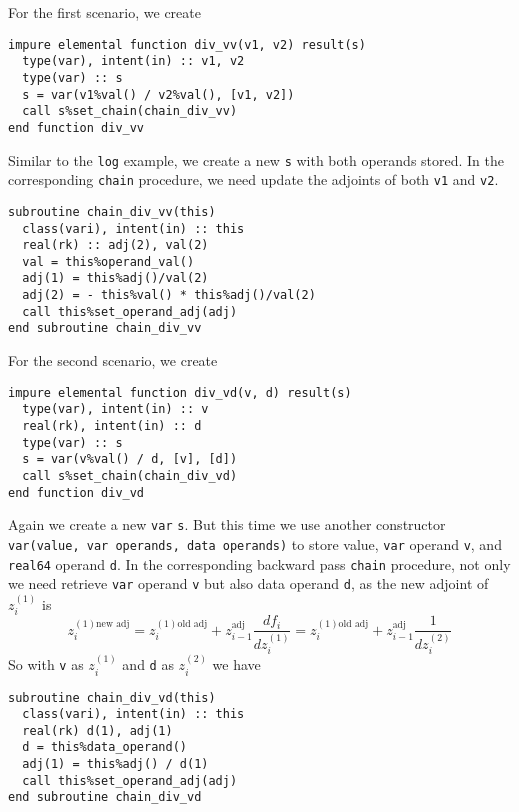 \documentclass[12pt, reqno, oneside]{amsbook}
\numberwithin{equation}{chapter}
\begin{document}
For the first scenario, we create
\begin{verbatim}
impure elemental function div_vv(v1, v2) result(s)
  type(var), intent(in) :: v1, v2
  type(var) :: s
  s = var(v1%val() / v2%val(), [v1, v2])
  call s%set_chain(chain_div_vv)
end function div_vv
\end{verbatim}
Similar to the \texttt{log} example, we create a new \texttt{s} with both operands
stored. In the corresponding \texttt{chain} procedure, we need update
the adjoints of both \texttt{v1} and \texttt{v2}.
\begin{verbatim}
subroutine chain_div_vv(this)
  class(vari), intent(in) :: this
  real(rk) :: adj(2), val(2)
  val = this%operand_val()
  adj(1) = this%adj()/val(2)
  adj(2) = - this%val() * this%adj()/val(2)
  call this%set_operand_adj(adj)
end subroutine chain_div_vv
\end{verbatim}

For the second scenario, we create
\begin{verbatim}
impure elemental function div_vd(v, d) result(s)
  type(var), intent(in) :: v
  real(rk), intent(in) :: d
  type(var) :: s
  s = var(v%val() / d, [v], [d])
  call s%set_chain(chain_div_vd)
end function div_vd
\end{verbatim}
Again we create a new \texttt{var} \texttt{s}. But this time
we use another constructor \texttt{var(value, var operands, data
operands)} to store value, \texttt{var} operand \texttt{v}, and \texttt{real64}
operand \texttt{d}. In the corresponding backward pass \texttt{chain} procedure, not
      only we need retrieve \texttt{var} operand \texttt{v} but also data operand
      \texttt{d}, as the new adjoint of \(z_i^{(1)}\) is
\begin{equation*}
z_i^{(1)\text{new adj}} = z_i^{(1)\text{old adj}} + z_{i-1}^{\text{adj}}\frac{df_i}{dz_i^{(1)}}
= z_i^{(1)\text{old adj}} + z_{i-1}^{\text{adj}}\frac{1}{dz_i^{(2)}}
\end{equation*}      
So with \texttt{v} as \(z_i^{(1)}\) and \texttt{d} as \(z_i^{(2)}\) we have
\begin{verbatim}
subroutine chain_div_vd(this)
  class(vari), intent(in) :: this
  real(rk) d(1), adj(1)
  d = this%data_operand()
  adj(1) = this%adj() / d(1)
  call this%set_operand_adj(adj)
end subroutine chain_div_vd
\end{verbatim}
\end{document}
